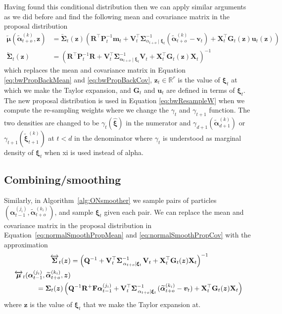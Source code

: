 \documentclass[notitlepage]{article}
\renewcommand{\vec}[1]{\bm{#1}}
\newcommand{\vecLarrow}[1]{\overleftarrow{\vec{#1}}}
\newcommand{\vecLRarrow}[1]{\overleftrightarrow{\vec{#1}}}
\newcommand{\mat}[1]{\mathbf{#1}}
\newcommand{\matLarrow}[1]{\overleftarrow{\mat{#1}}}
\newcommand{\matLRarrow}[1]{\overleftrightarrow{\mat{#1}}}
\newcommand{\Lparen}[1]{\left( #1\right)}
\newcommand\subCond[3]{#1_{\left. #2 \middle\vert #3\right.}}
\newcommand{\partic}[3]{#1_{#2}^{\Lparen{#3}}}
\newcommand{\particB}[3]{\widetilde{#1}_{#2}^{\Lparen{#3}}}
\newcommand{\dimRng}{r}
\newcommand{\nPeriods}{d}
\begin{document}
Having found this conditional distribution then we can apply similar arguments as we did 
before and find the following mean and covariance matrix in the proposal distribution %
%
\begin{align*}
\vecLarrow\mu (\particB{\vec{\alpha}}{t + o}k, \vec z)
	&= \matLarrow\Sigma_t(\vec z)\Lparen{
	\mat R^\top\mat P_t^{-1}\vec m_t + 
	\mat V_t^\top\subCond{\mat\Sigma}{\alpha_{t + o}}{\vec\xi_t}^{-1}
	(\particB{\vec{\alpha}}{t + o}k - \vec v_t) + 
	\mat X_t^\top\mat G_t(\vec z)\vec u_t(\vec z)} \\
\matLarrow\Sigma_t(\vec z) &= 
	\Lparen{
		\mat R^\top\mat P_t^{-1} \mat R + 
		\mat V_t^\top\subCond{\mat\Sigma}{\vec{\alpha}_{t + o}}{\vec\xi_t}^{-1}\mat V_t + 
		\mat X_t^\top \mat G_t(\vec z) \mat X_t}^{-1}
\end{align*} %
%
which replaces the mean and covariance matrix in Equation \eqref{eq:bwPropBackMean} and \eqref{eq:bwPropBackCov},
$\vec z_t\in\mathbb R^\dimRng$ is the value of $\vec\xi_t$ at which we make the Taylor expansion, and
$\mat G_t$ and $\vec u_t$ are defined in terms of $\vec\xi_t$. The new proposal distribution 
is used in Equation \eqref{eq:bwResampleW} when we compute the re-sampling weights where 
we change the $\gamma_t$ and $\gamma_{t+1}$ function. The two densities are changed to be 
$\gamma_t(\widehat{\vec\xi})$ in the numerator and 
$\gamma_{\nPeriods + 1}(\particB{\vec{\alpha}}{\nPeriods + 1}k)$ or 
$\gamma_{t + 1}(\particB{\vec\xi}{t + 1}k)$ at $t < \nPeriods$ in the denominator 
where $\gamma_t$ is understood as marginal density of $\vec\xi_t$ when xi is used instead 
of alpha.

\subsection{Combining/smoothing}
Similarly, in Algorithm~\ref{alg:ONsmoother} we sample pairs of particles 
$(\partic{\vec{\alpha}}{t - 1}{j_i}, \particB{\vec{\alpha}}{t + o}{k_i})$, 
and sample $\vec\xi_t$ given each pair. We can replace the mean and covariance matrix in 
the proposal distribution in Equation~\eqref{eq:normalSmoothPropMean} and 
\eqref{eq:normalSmoothPropCov} with the approximation %
%
\begin{align*}
\matLRarrow\Sigma_t(\vec z) &= \Lparen{
	\mat Q^{-1} + 
	\mat V_t^\top\subCond{\mat\Sigma}{\alpha_{t + o}}{\vec\xi_t}^{-1}\mat V_t + 
	\mat X_t^\top \mat G_t(\vec z) \mat X_t}^{-1}\\
\vecLRarrow\mu_t(\partic{\vec{\alpha}}{t - 1}{j_i}, 
	\particB{\vec{\alpha}}{t + o}{k_i}, \vec z) & \\
	&\hspace{-50pt}=
	\mat\Sigma_t(\vec z)\Lparen{
		\mat Q^{-1}\mat R^+\mat F\partic{\vec{\alpha}}{t - 1}{j_i} + 
		\mat V_t^\top\subCond{\mat\Sigma}{\alpha_{t + o}}{\vec\xi_t}^{-1}
			(\particB{\vec{\alpha}}{t + o}{k_i} - \vec v_t) + 
		\mat X_t^\top \mat G_t(\vec z) \mat X_t}
\end{align*}%
% 
where $\vec z$ is the value of $\vec\xi_t$ that we make the Taylor expansion at. 
\end{document}

